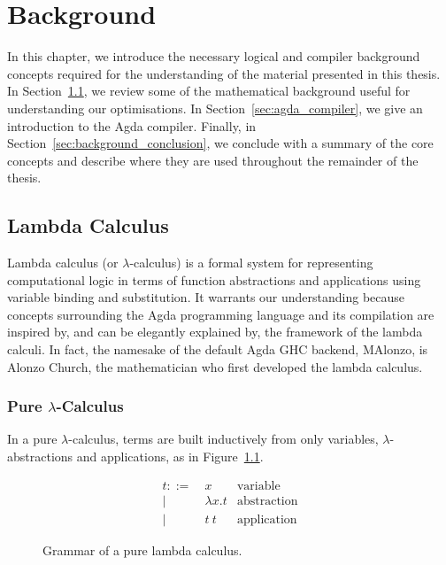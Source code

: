 \chapter{Background}
\label{cha:background}

In this chapter, we introduce the necessary logical and compiler background concepts required for the understanding of the material presented in this thesis. In Section~\ref{sec:lambda_calc}, we review some of the mathematical background useful for understanding our optimisations. In Section~\ref{sec:agda_compiler}, we give an introduction to the Agda compiler. Finally, in Section~\ref{sec:background_conclusion}, we conclude with a summary of the core concepts and describe where they are used throughout the remainder of the thesis.

\section{Lambda Calculus}
\label{sec:lambda_calc}

Lambda calculus (or $\lambda$-calculus) is a formal system for representing computational logic in terms of function abstractions and applications using variable binding and substitution. It warrants our understanding because concepts surrounding the Agda programming language and its compilation are inspired by, and can be elegantly explained by, the framework of the lambda calculi.\cite{fokkinga1987} In fact, the namesake of the default Agda GHC backend, MAlonzo, is Alonzo Church, the mathematician who first developed the lambda calculus.\cite{fokkinga1987}

\subsection{Pure $\lambda$-Calculus}

In a pure $\lambda$-calculus, terms are built inductively from only variables, $\lambda$-abstractions and applications, as in Figure~\ref{fig:lambda_calc}.\cite{kozen1997}

\begin{figure}[h]
\begin{align*}
t ::=~& x               & \text{variable}\\
    |~& \lambda x . t   & \text{abstraction}\\
    |~& t~t             & \text{application}
\end{align*}
\caption{Grammar of a pure lambda calculus.}
\label{fig:lambda_calc}
\end{figure}

